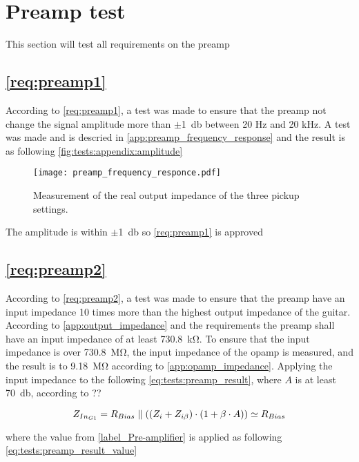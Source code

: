 \section{Preamp test}
This section will test all requirements on the \gls{preamp} 


\subsection{\autoref{req:preamp1}}
According to \autoref{req:preamp1}, a test was made to ensure that the \gls{preamp} not change the signal amplitude more than $\pm$\SI{1}{\decibel} between 20 Hz and 20 kHz. A test was made and is descried in \autoref{app:preamp_frequency_response} and the result is as following \autoref{fig:tests:appendix:amplitude}

\begin{figure}[htbp!]
	\centering
		\texttt{[image: preamp\_frequency\_responce.pdf]}
		\caption{Measurement of the real output impedance of the three pickup settings.}
		\label{fig:tests:appendix:amplitude}
\end{figure}

The amplitude is within $\pm$\SI{1}{\decibel} so \autoref{req:preamp1} is approved


\subsection{\autoref{req:preamp2}}
According to \autoref{req:preamp2}, a test was made to ensure that the \gls{preamp} have an input impedance 10 times more than the highest output impedance of the guitar. According to \autoref{app:output_impedance} and the requirements the \gls{preamp} shall have an input impedance of at least \SI{730.8}{\kilo\ohm}. To ensure that the input impedance is over \SI{730.8}{\mega\ohm}, the input impedance of the \gls{opamp} is measured, and the result is to \SI{9.18}{\mega\ohm} according to \autoref{app:opamp_impedance}. Applying the input impedance to the following \autoref{eq:tests:preamp_result}, where $A$ is at least \SI{70}{\decibel}, according to ??  

\begin{equation}\label{eq:tests:preamp_result}
        Z_{In_{G1}} = R_{Bias} \parallel ((Z_i + Z_{i \beta}) \cdot (1+\beta \cdot A)) \simeq R_{Bias}
        \addunit{\si{\ohm}}
    \end{equation}

where the value from \autoref{label_Pre-amplifier} is applied as following \autoref{eq:tests:preamp_result_value}




